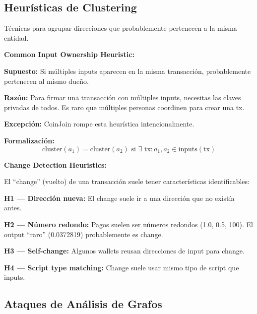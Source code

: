 \documentclass[11pt,a4paper,twoside]{book}
\begin{document}
\subsection{Heur\'isticas de Clustering}

\begin{definition}
T\'ecnicas para agrupar direcciones que probablemente pertenecen a la misma entidad.
\end{definition}

\begin{mathnote}
\textbf{Common Input Ownership Heuristic:}

\textbf{Supuesto:} Si m\'ultiples inputs aparecen en la misma transacci\'on, probablemente pertenecen al mismo due\~no.

\textbf{Raz\'on:} Para firmar una transacci\'on con m\'ultiples inputs, necesitas las claves privadas de todos. Es raro que m\'ultiples personas coordinen para crear una tx.

\textbf{Excepci\'on:} CoinJoin rompe esta heur\'istica intencionalmente.

\textbf{Formalizaci\'on:}
\[
\text{cluster}(a_1) = \text{cluster}(a_2) \text{ si } \exists \text{ tx}: a_1, a_2 \in \text{inputs}(\text{tx})
\]
\end{mathnote}

\begin{mathnote}
\textbf{Change Detection Heuristics:}

El ``change'' (vuelto) de una transacci\'on suele tener caracter\'isticas identificables:

\textbf{H1 --- Direcci\'on nueva:} El change suele ir a una direcci\'on que no exist\'ia antes.

\textbf{H2 --- N\'umero redondo:} Pagos suelen ser n\'umeros redondos (1.0, 0.5, 100). El output ``raro'' (0.0372819) probablemente es change.

\textbf{H3 --- Self-change:} Algunos wallets reusan direcciones de input para change.

\textbf{H4 --- Script type matching:} Change suele usar mismo tipo de script que inputs.
\end{mathnote}

\subsection{Ataques de An\'alisis de Grafos}
\end{document}
